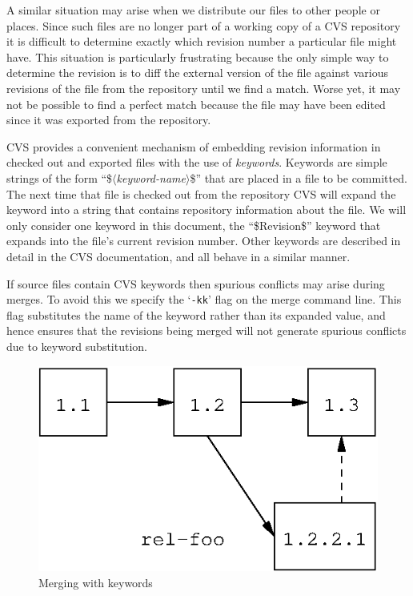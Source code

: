 \documentclass[12pt,letterpaper]{article}
\newcommand{\cmd}[1]{`\texttt{#1}'}
\begin{document}
A similar situation may arise when we distribute our files to other people or
places.  Since such files are no longer part of a working copy of a CVS
repository it is difficult to determine exactly which revision number a
particular file might have.  This situation is particularly frustrating
because the only simple way to determine the revision is to diff the external
version of the file against various revisions of the file from the repository
until we find a match.  Worse yet, it may not be possible to find a perfect
match because the file may have been edited since it was exported from the
repository.

CVS provides a convenient mechanism of embedding revision information in
checked out and exported files with the use of \emph{keywords}.  Keywords are
simple strings of the form ``\$$\langle$\textit{keyword-name}$\rangle$\$''
that are placed in a file to be committed.  The next time that file is checked
out from the repository CVS will expand the keyword into a string that
contains repository information about the file.  We will only consider one
keyword in this document, the ``\$Revision\$'' keyword that expands into the
file's current revision number.  Other keywords are described in detail in the
CVS documentation, and all behave in a similar manner.

If source files contain CVS keywords then spurious conflicts may arise during
merges.  To avoid this we specify the \cmd{-kk} flag on the merge command
line.  This flag substitutes the name of the keyword rather than its expanded
value, and hence ensures that the revisions being merged will not generate
spurious conflicts due to keyword substitution.

\begin{figure}[htb]
\begin{center}
\includegraphics{revhist-kmerge.eps}
\end{center}
\caption{Merging with keywords}
\label{fig:revhist-kmerge}
\end{figure}
\end{document}
